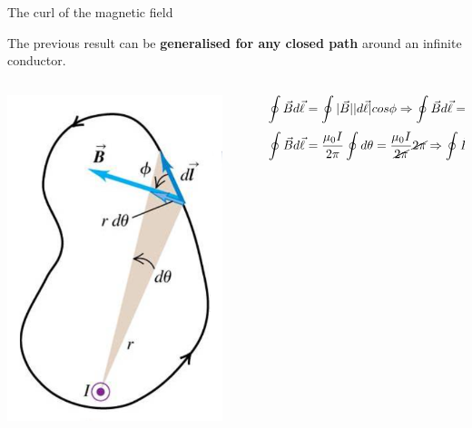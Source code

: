 %
%
%

\begin{frame}{The curl of the magnetic field}

The previous result can be {\bf generalised for any closed path} around an infinite conductor.\\

\begin{columns}
  \begin{column}{0.20\textwidth}
    \includegraphics[width=0.90\textwidth]{./images/schematics/magnetic_field_path_integral_generalisation_any_shape.png}
  \end{column}
  \begin{column}{0.80\textwidth}
      \begin{equation*}
         \oint \vec{B}  d\vec{\ell} = \oint |\vec{B}| |d\vec{\ell}| cos\phi \Rightarrow
         \oint \vec{B}  d\vec{\ell} = \oint \Big( \frac{\mu_0 I}{2\pi \cancel{r}} \Big) \Big( \cancel{r} \; d\theta \Big) \Rightarrow
      \end{equation*}
      \begin{equation*}
         \oint \vec{B}  d\vec{\ell} =  \frac{\mu_0 I}{2\pi} \oint d\theta =   \frac{\mu_0 I}{\cancel{2\pi}} \cancel{2\pi}  \Rightarrow
         \oint \vec{B}  d\vec{\ell} =  \mu_0 I
      \end{equation*}
  \end{column}
\end{columns}


\end{frame}
